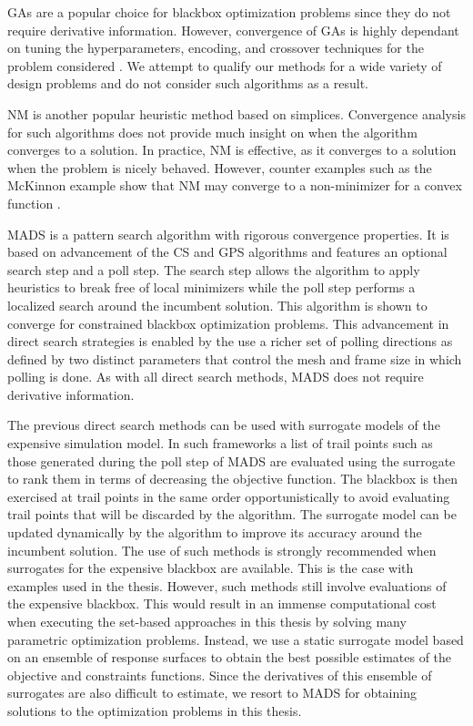 \Acfp{GA} are a popular choice for blackbox optimization problems since they do not require derivative information. However, convergence of \acp{GA} is highly dependant on tuning the hyperparameters, encoding, and crossover techniques for the problem considered \cite{Audet2017}. We attempt to qualify our methods for a wide variety of design problems and do not consider such algorithms as a result.

\Ac{NM} is another popular heuristic method based on simplices. Convergence analysis for such algorithms does not provide much insight on when the algorithm converges to a solution. In practice, \ac{NM} is effective, as it converges to a solution when the problem is nicely behaved. However, counter examples such as the McKinnon example show that \ac{NM} may converge to a non-minimizer for a convex function \cite{Audet2017}.

\Ac{MADS} is a pattern search algorithm with rigorous convergence properties. It is based on advancement of the \ac{CS} and \ac{GPS} algorithms and features an optional search step and a poll step. The search step allows the algorithm to apply heuristics to break free of local minimizers while the poll step performs a localized search around the incumbent solution. This algorithm is shown to converge for constrained blackbox optimization problems. This advancement in direct search strategies is enabled by the use a richer set of polling directions as defined by two distinct parameters that control the mesh and frame size in which polling is done. As with all direct search methods, \ac{MADS} does not require derivative information.

The previous direct search methods can be used with surrogate models of the expensive simulation model. In such frameworks a list of trail points such as those generated during the poll step of \ac{MADS} are evaluated using the surrogate to rank them in terms of decreasing the objective function. The blackbox is then exercised at trail points in the same order opportunistically to avoid evaluating trail points that will be discarded by the algorithm. The surrogate model can be updated dynamically by the algorithm to improve its accuracy around the incumbent solution. The use of such methods is strongly recommended when surrogates for the expensive blackbox are available. This is the case with examples used in the thesis. However, such methods still involve evaluations of the expensive blackbox. This would result in an immense computational cost when executing the set-based approaches in this thesis by solving many parametric optimization problems. Instead, we use a static surrogate model based on an ensemble of response surfaces to obtain the best possible estimates of the objective and constraints functions. Since the derivatives of this ensemble of surrogates are also difficult to estimate, we resort to \ac{MADS} for obtaining solutions to the optimization problems in this thesis.

